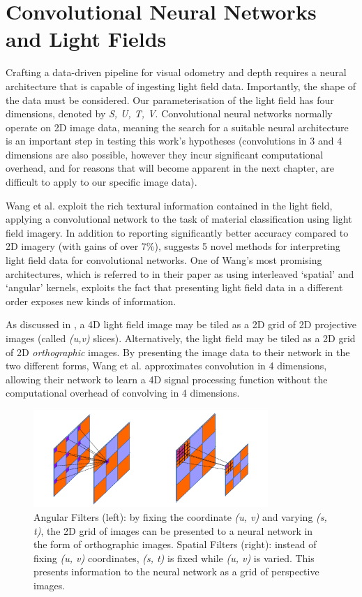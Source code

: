\section{Convolutional Neural Networks and Light Fields}


Crafting a data-driven pipeline for visual odometry and depth requires a neural architecture that is capable of ingesting light field data. Importantly, the shape of the data must be considered. Our parameterisation of the light field has four dimensions, denoted by \textit{S, U, T, V}. Convolutional neural networks normally operate on 2D image data, meaning the search for a suitable neural architecture is an important step in testing this work's hypotheses (convolutions in 3 and 4 dimensions are also possible, however they incur significant computational overhead, and for reasons that will become apparent in the next chapter, are difficult to apply to our specific image data).


Wang et al. \cite{wang2016lfcnn} exploit the rich textural information contained in the light field, applying a convolutional network to the task of material classification using light field imagery. In addition to reporting significantly better accuracy compared to 2D imagery (with gains of over 7\%), \cite{wang2016lfcnn} suggests 5 novel methods for interpreting light field data for convolutional networks. One of Wang's most promising architectures, which is referred to in their paper as using interleaved `spatial' and `angular' kernels, exploits the fact that presenting light field data in a different order exposes new kinds of information. 

As discussed in \cite{dansereau2014phd}, a 4D light field image may be tiled as a 2D grid of 2D projective images (called \textit{(u,v)} slices). Alternatively, the light field may be tiled as a 2D grid of 2D \textit{orthographic} images. By presenting the image data to their network in the two different forms, Wang et al. approximates convolution in 4 dimensions, allowing their network to learn a 4D signal processing function without the computational overhead of convolving in 4 dimensions.

\begin{figure}
    \centering 
    \includegraphics[width=3.5in]{images/spatial-angular.png}
    \caption{Angular Filters (left): by fixing the coordinate \textit{(u, v)} and varying \textit{(s, t)}, the 2D grid of images can be presented to a neural network in the form of orthographic images. Spatial Filters (right): instead of fixing \textit{(u, v)} coordinates, \textit{(s, t)} is fixed while \textit{(u, v)} is varied. This presents information to the neural network as a grid of perspective images.}
    \label{spatial-angular}
\end{figure}


